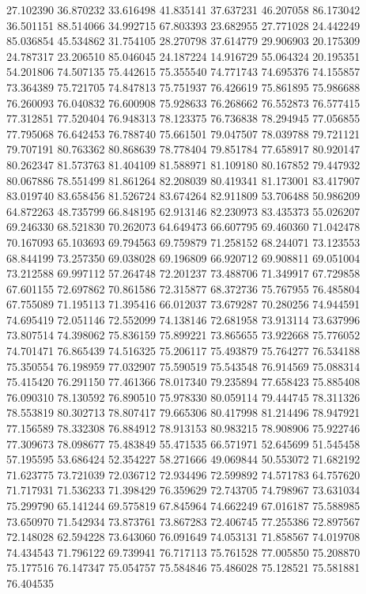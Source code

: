27.102390
36.870232
33.616498
41.835141
37.637231
46.207058
86.173042
36.501151
88.514066
34.992715
67.803393
23.682955
27.771028
24.442249
85.036854
45.534862
31.754105
28.270798
37.614779
29.906903
20.175309
24.787317
23.206510
85.046045
24.187224
14.916729
55.064324
20.195351
54.201806
74.507135
75.442615
75.355540
74.771743
74.695376
74.155857
73.364389
75.721705
74.847813
75.751937
76.426619
75.861895
75.986688
76.260093
76.040832
76.600908
75.928633
76.268662
76.552873
76.577415
77.312851
77.520404
76.948313
78.123375
76.736838
78.294945
77.056855
77.795068
76.642453
76.788740
75.661501
79.047507
78.039788
79.721121
79.707191
80.763362
80.868639
78.778404
79.851784
77.658917
80.920147
80.262347
81.573763
81.404109
81.588971
81.109180
80.167852
79.447932
80.067886
78.551499
81.861264
82.208039
80.419341
81.173001
83.417907
83.019740
83.658456
81.526724
83.674264
82.911809
53.706488
50.986209
64.872263
48.735799
66.848195
62.913146
82.230973
83.435373
55.026207
69.246330
68.521830
70.262073
64.649473
66.607795
69.460360
71.042478
70.167093
65.103693
69.794563
69.759879
71.258152
68.244071
73.123553
68.844199
73.257350
69.038028
69.196809
66.920712
69.908811
69.051004
73.212588
69.997112
57.264748
72.201237
73.488706
71.349917
67.729858
67.601155
72.697862
70.861586
72.315877
68.372736
75.767955
76.485804
67.755089
71.195113
71.395416
66.012037
73.679287
70.280256
74.944591
74.695419
72.051146
72.552099
74.138146
72.681958
73.913114
73.637996
73.807514
74.398062
75.836159
75.899221
73.865655
73.922668
75.776052
74.701471
76.865439
74.516325
75.206117
75.493879
75.764277
76.534188
75.350554
76.198959
77.032907
75.590519
75.543548
76.914569
75.088314
75.415420
76.291150
77.461366
78.017340
79.235894
77.658423
75.885408
76.090310
78.130592
76.890510
75.978330
80.059114
79.444745
78.311326
78.553819
80.302713
78.807417
79.665306
80.417998
81.214496
78.947921
77.156589
78.332308
76.884912
78.913153
80.983215
78.908906
75.922746
77.309673
78.098677
75.483849
55.471535
66.571971
52.645699
51.545458
57.195595
53.686424
52.354227
58.271666
49.069844
50.553072
71.682192
71.623775
73.721039
72.036712
72.934496
72.599892
74.571783
64.757620
71.717931
71.536233
71.398429
76.359629
72.743705
74.798967
73.631034
75.299790
65.141244
69.575819
67.845964
74.662249
67.016187
75.588985
73.650970
71.542934
73.873761
73.867283
72.406745
77.255386
72.897567
72.148028
62.594228
73.643060
76.091649
74.053131
71.858567
74.019708
74.434543
71.796122
69.739941
76.717113
75.761528
77.005850
75.208870
75.177516
76.147347
75.054757
75.584846
75.486028
75.128521
75.581881
76.404535
